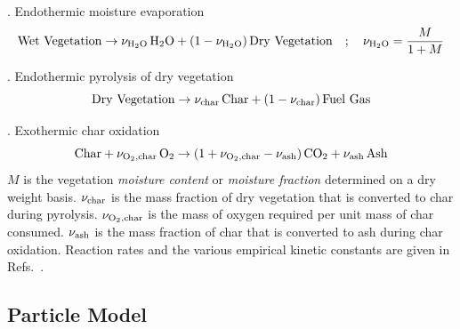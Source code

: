 \documentclass[journal,article,atmosphere,submit,moreauthors,pdftex]{Definitions_Review_Process/mdpi}
\begin{document}
\vspace{\baselineskip}

. Endothermic moisture evaporation
\begin{equation}
 {\rm Wet\ Vegetation} \rightarrow \nu_{\rm H_2O} \, {\rm H_2O} + (1-\nu_{\rm H_2O}) \, {\rm Dry\ Vegetation} \quad ; \quad \nu_{\rm H_2O} = \frac{M}{1+M}
\end{equation}

. Endothermic pyrolysis of dry vegetation
\begin{equation}
 {\rm Dry\ Vegetation} \rightarrow \nu_{\rm char} \, {\rm Char} + (1-\nu_{\rm char}) \, {\rm Fuel\ Gas}
\end{equation}

. Exothermic char oxidation
\begin{equation}
 \label{char_reaction}
 {\rm Char} + \nu_{\rm O_2, char} \, {\rm O_2} \rightarrow (1+ \nu_{\rm O_2,char} - \nu_{\rm ash}) \, {\rm CO_2} + \nu_{\rm ash} \, {\rm Ash}
\end{equation}
$M$ is the vegetation {\em moisture content} or {\em moisture fraction} determined on a dry weight basis. $\nu_{\rm char}$ is the mass fraction of dry vegetation that is converted to char during pyrolysis.   $\nu_{\rm O_2,char}$ is the mass of oxygen required per unit mass of char consumed. $\nu_{\rm ash}$  is the mass fraction of char that is converted to ash during char oxidation. Reaction rates and the various empirical kinetic constants are given in Refs.~\cite{Porterie:2006,Morvan:CF2004,Houssami:2016}.

\subsection{Particle Model}
\label{particle_model}
\end{document}
